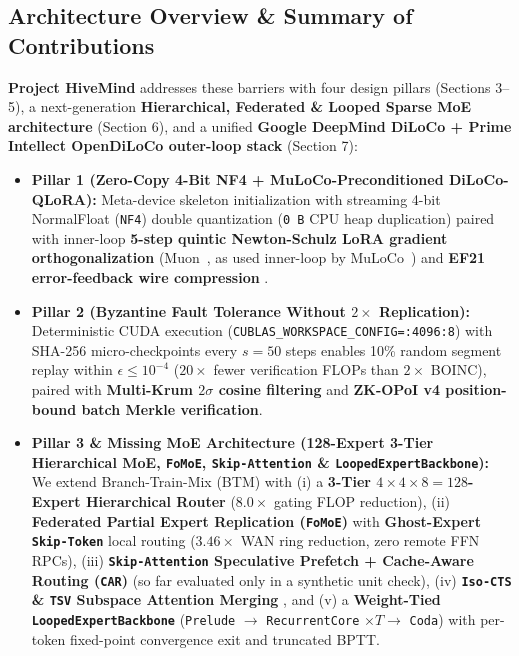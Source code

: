 \documentclass[11pt,a4paper]{article}
\begin{document}
\subsection{Architecture Overview \& Summary of Contributions}

\textbf{Project HiveMind} addresses these barriers with four design pillars (Sections 3--5), a next-generation \textbf{Hierarchical, Federated \& Looped Sparse MoE architecture} (Section 6), and a unified \textbf{Google DeepMind DiLoCo + Prime Intellect OpenDiLoCo outer-loop stack} (Section 7):

\begin{itemize}[leftmargin=1.8em]
    \item \textbf{Pillar 1 (Zero-Copy 4-Bit NF4 + MuLoCo-Preconditioned DiLoCo-QLoRA):} Meta-device skeleton initialization with streaming 4-bit NormalFloat (\texttt{NF4}) double quantization (\texttt{0\,B} CPU heap duplication) paired with inner-loop \textbf{5-step quintic Newton-Schulz LoRA gradient orthogonalization} (Muon~\cite{jordan2024muon}, as used inner-loop by MuLoCo~\cite{therien2025muloco,belilovsky2026inner}) and \textbf{EF21 error-feedback wire compression} \cite{richtarik2021ef21,sarfi2025sparseloco,peng2024demo}.
    \item \textbf{Pillar 2 (Byzantine Fault Tolerance Without $2\times$ Replication):} Deterministic CUDA execution (\texttt{CUBLAS\_WORKSPACE\_CONFIG=:4096:8}) with SHA-256 micro-checkpoints every $s=50$ steps enables 10\% random segment replay within $\epsilon \le 10^{-4}$ ($20\times$ fewer verification FLOPs than $2\times$ BOINC), paired with \textbf{Multi-Krum $2\sigma$ cosine filtering} \cite{blanchard2017krum} and \textbf{ZK-OPoI v4 position-bound batch Merkle verification}.
    \item \textbf{Pillar 3 \& Missing MoE Architecture (128-Expert 3-Tier Hierarchical MoE, \texttt{FoMoE}, \texttt{Skip-Attention} \& \texttt{LoopedExpertBackbone}):} We extend Branch-Train-Mix (BTM) \cite{sukhbaatar2024btm} with (i) a \textbf{3-Tier $4 \times 4 \times 8 = 128$-Expert Hierarchical Router} ($8.0\times$ gating FLOP reduction), (ii) \textbf{Federated Partial Expert Replication (\texttt{FoMoE})} \cite{sani2026fomoe} with \textbf{Ghost-Expert \texttt{Skip-Token}} local routing ($3.46\times$ WAN ring reduction, zero remote FFN RPCs), (iii) \textbf{\texttt{Skip-Attention} Speculative Prefetch + Cache-Aware Routing (\texttt{CAR})} \cite{merolla2025fomoe} (so far evaluated only in a synthetic unit check), (iv) \textbf{\texttt{Iso-CTS} \& \texttt{TSV} Subspace Attention Merging} \cite{marczak2025iso,horoi2026isoloco,gargiulo2024tsv}, and (v) a \textbf{Weight-Tied \texttt{LoopedExpertBackbone}} (\texttt{Prelude} $\to$ \texttt{RecurrentCore} $\times T \to$ \texttt{Coda}) \cite{loopedmoe2026,loopedfp2026} with per-token fixed-point convergence exit and truncated BPTT.

\end{itemize}
\end{document}
